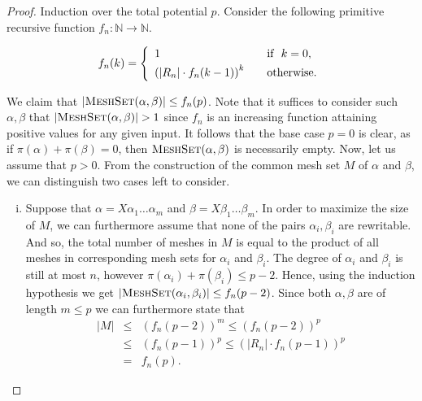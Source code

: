 \documentclass[11pt,a4paper]{amsart}
\theoremstyle{definition}
\newcommand{\MeshSet}[2]{\textsc{MeshSet}(#1,#2)}
\newcommand{\potential}[1]{\pi(#1)}
\begin{document}
\begin{proof}
        Induction over the total potential $p$. Consider the following primitive recursive function $f_n :\mathbb{N} \to \mathbb{N}$.
    
    \begin{equation*}
  f_n(k) = \left\{\begin{array}{r@{}l@{\qquad}l}
    & 1 & \text{if }\ k = 0, \\[\jot]
    & {\left(|R_n| \cdot f_n(k-1)\right)}^{k} & \text{otherwise.}
  \end{array}\right.
\end{equation*}

    We claim that $|\MeshSet{\alpha}{\beta}| \leq f_n(p)$. Note that it suffices
    to consider such $\alpha,\beta$ that $|\MeshSet{\alpha}{\beta}| > 1$ since
    $f_n$ is an increasing function attaining positive values for any given input.
	It follows that the base case $p = 0$ is clear, as if $\potential{\alpha} + \potential{\beta} = 0$, then $\MeshSet{\alpha}{\beta}$ is necessarily empty.
	Now, let us assume that $p > 0$. From the construction of the common mesh set $M$ of $\alpha$ and $\beta$, we can distinguish two cases left to consider.
    \begin{enumerate}[(i)]
        \item Suppose that $\alpha = X \alpha_1 \ldots \alpha_m$ and
                $\beta = X \beta_1 \ldots \beta_m$. In order to maximize the
                size of $M$, we can furthermore assume that none of the pairs
                 $\alpha_i,\beta_i$ are rewritable. And so, the total
                number of meshes in $M$ is equal to the product of all meshes in
                corresponding mesh sets for $\alpha_i$ and $\beta_i$. The degree
                of $\alpha_i$ and $\beta_i$ is still at most $n$,
                however $\potential{\alpha_i} + \potential{\beta_i} \leq p-2$. Hence,
                using the induction hypothesis we get
                $ |\MeshSet{\alpha_i}{\beta_i}| \leq f_n(p-2)$.
                Since both $\alpha,\beta$ are of length $m \leq p$ we can furthermore
                state that
                \begin{eqnarray*}
                        |M| &\leq& \left(f_n(p-2)\right)^m \leq \left(f_n(p-2)\right)^p\\
                            &\leq& \left(f_n(p-1)\right)^p \leq 
                            \left(|R_n| \cdot f_n(p-1)\right)^p\\
                            &=& f_n(p).
                \end{eqnarray*}

\end{enumerate}
\end{proof}
\end{document}
